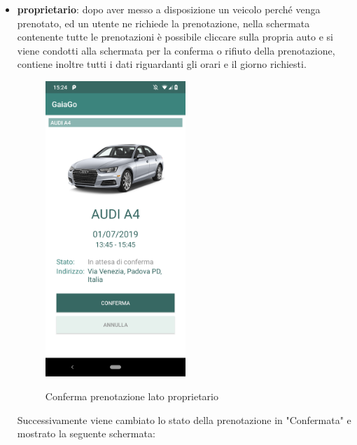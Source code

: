 \begin{itemize}
\pagebreak
	\item \textbf{proprietario}: dopo aver messo a disposizione un veicolo perché venga prenotato, ed un utente ne richiede la prenotazione, nella schermata contenente tutte le prenotazioni è possibile cliccare sulla propria auto e si viene condotti alla schermata per la conferma o rifiuto della prenotazione, contiene inoltre tutti i dati riguardanti gli orari e il giorno richiesti.
	  \begin{figure}[H] 
		\centering 
		\includegraphics[width=0.5\textwidth]{res/images/conferma_proprietario.png}\\
		\caption{Conferma prenotazione lato proprietario}
		\label{conferma prenotazione}
	\end{figure}
	\pagebreak
	Successivamente viene cambiato lo stato della prenotazione in "Confermata" e mostrato la seguente schermata:
	\begin{figure}[H] 
		\centering 

\end{figure}
\end{itemize}

